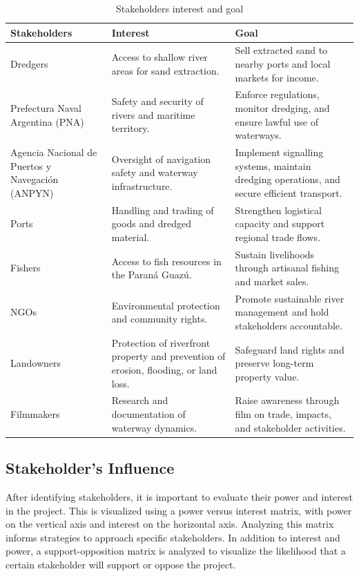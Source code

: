 \begin{table}[H]
\centering
\begin{tabularx}{\linewidth}{p{3.5cm}XX}
\toprule
Stakeholders & Interest & Goal \\
\midrule
Dredgers & Access to shallow river areas for sand extraction. & Sell extracted sand to nearby ports and local markets for income. \\
\midrule
Prefectura Naval Argentina (PNA) & Safety and security of rivers and maritime territory. & Enforce regulations, monitor dredging, and ensure lawful use of waterways. \\
\midrule
Agencia Nacional de Puertos y Navegación (ANPYN) & Oversight of navigation safety and waterway infrastructure. & Implement signalling systems, maintain dredging operations, and secure efficient transport. \\
\midrule
Ports & Handling and trading of goods and dredged material. & Strengthen logistical capacity and support regional trade flows. \\
\midrule
Fishers & Access to fish resources in the Paraná Guazú. & Sustain livelihoods through artisanal fishing and market sales. \\
\midrule
NGOs & Environmental protection and community rights. & Promote sustainable river management and hold stakeholders accountable. \\
\midrule
Landowners & Protection of riverfront property and prevention of erosion, flooding, or land loss. & Safeguard land rights and preserve long-term property value. \\
\midrule
Filmmakers & Research and documentation of waterway dynamics. & Raise awareness through film on trade, impacts, and stakeholder activities. \\
\bottomrule
\end{tabularx}
\caption{Stakeholders interest and goal}
\label{tab:stakeholders-interests-goals}
\end{table}

\subsection{Stakeholder's Influence}
After identifying stakeholders, it is important to evaluate their power and interest in the project. This is visualized using a power versus interest matrix, with power on the vertical axis and interest on the horizontal axis. Analyzing this matrix informs strategies to approach specific stakeholders. In addition to interest and power, a support-opposition matrix is analyzed to visualize the likelihood that a certain stakeholder will support or oppose the project.

